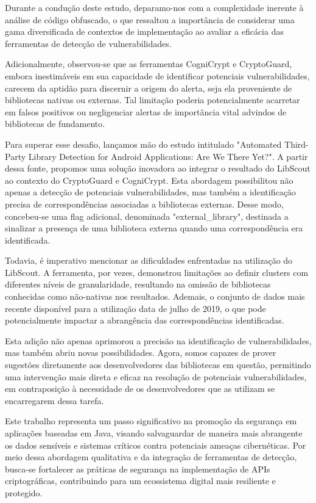 Durante a condução deste estudo, deparamo-nos com a complexidade inerente à análise de código obfuscado, o que ressaltou a importância de considerar uma gama diversificada de contextos de implementação ao avaliar a eficácia das ferramentas de detecção de vulnerabilidades.

Adicionalmente, observou-se que as ferramentas CogniCrypt e CryptoGuard, embora inestimáveis em sua capacidade de identificar potenciais vulnerabilidades, carecem da aptidão para discernir a origem do alerta, seja ela proveniente de bibliotecas nativas ou externas. Tal limitação poderia potencialmente acarretar em falsos positivos ou negligenciar alertas de importância vital advindos de bibliotecas de fundamento.

Para superar esse desafio, lançamos mão do estudo  intitulado "Automated Third-Party Library Detection for Android Applications: Are We There Yet?". A partir dessa fonte, propomos uma solução inovadora ao integrar o resultado do LibScout ao contexto do CryptoGuard e CogniCrypt. Esta abordagem possibilitou não apenas a detecção de potenciais vulnerabilidades, mas também a identificação precisa de correspondências associadas a bibliotecas externas. Desse modo, concebeu-se uma flag adicional, denominada "external\_library", destinada a sinalizar a presença de uma biblioteca externa quando uma correspondência era identificada.

Todavia, é imperativo mencionar as dificuldades enfrentadas na utilização do LibScout. A ferramenta, por vezes, demonstrou limitações ao definir clusters com diferentes níveis de granularidade, resultando na omissão de bibliotecas conhecidas como não-nativas nos resultados. Ademais, o conjunto de dados mais recente disponível para a utilização data de julho de 2019, o que pode potencialmente impactar a abrangência das correspondências identificadas.

Esta adição não apenas aprimorou a precisão na identificação de vulnerabilidades, mas também abriu novas possibilidades. Agora, somos capazes de prover sugestões diretamente aos desenvolvedores das bibliotecas em questão, permitindo uma intervenção mais direta e eficaz na resolução de potenciais vulnerabilidades, em contraposição à necessidade de os desenvolvedores que as utilizam se encarregarem dessa tarefa.

Este trabalho representa um passo significativo na promoção da segurança em aplicações baseadas em Java, visando salvaguardar de maneira mais abrangente os dados sensíveis e sistemas críticos contra potenciais ameaças cibernéticas. Por meio dessa abordagem qualitativa e da integração de ferramentas de detecção, busca-se fortalecer as práticas de segurança na implementação de APIs criptográficas, contribuindo para um ecossistema digital mais resiliente e protegido.

